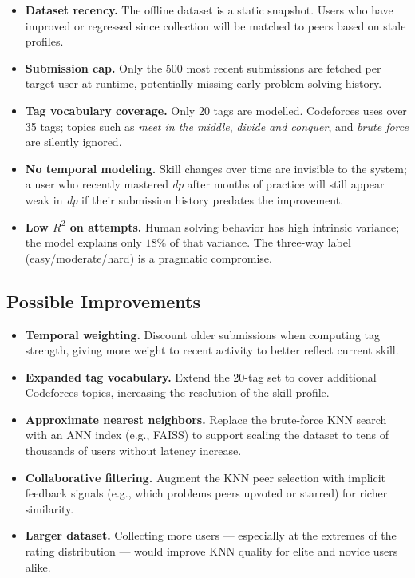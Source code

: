 \documentclass[12pt,a4paper]{article}
\begin{document}
\begin{itemize}
    \item \textbf{Dataset recency.} The offline dataset is a static snapshot.
          Users who have improved or regressed since collection will be matched
          to peers based on stale profiles.
    \item \textbf{Submission cap.} Only the 500 most recent submissions are
          fetched per target user at runtime, potentially missing early
          problem-solving history.
    \item \textbf{Tag vocabulary coverage.} Only 20 tags are modelled.
          Codeforces uses over 35 tags; topics such as \textit{meet in the
          middle}, \textit{divide and conquer}, and \textit{brute force} are
          silently ignored.
    \item \textbf{No temporal modeling.} Skill changes over time are invisible
          to the system; a user who recently mastered \textit{dp} after months
          of practice will still appear weak in \textit{dp} if their submission
          history predates the improvement.
    \item \textbf{Low $R^2$ on attempts.} Human solving behavior has high
          intrinsic variance; the model explains only $18\%$ of that variance.
          The three-way label (easy/moderate/hard) is a pragmatic compromise.
\end{itemize}

\subsection*{Possible Improvements}

\begin{itemize}
    \item \textbf{Temporal weighting.} Discount older submissions when computing
          tag strength, giving more weight to recent activity to better reflect
          current skill.
    \item \textbf{Expanded tag vocabulary.} Extend the 20-tag set to cover
          additional Codeforces topics, increasing the resolution of the skill
          profile.
    \item \textbf{Approximate nearest neighbors.} Replace the brute-force KNN
          search with an ANN index (e.g., FAISS) to support scaling the dataset
          to tens of thousands of users without latency increase.
    \item \textbf{Collaborative filtering.} Augment the KNN peer selection with
          implicit feedback signals (e.g., which problems peers upvoted or
          starred) for richer similarity.
    \item \textbf{Larger dataset.} Collecting more users --- especially at the
          extremes of the rating distribution --- would improve KNN quality for
          elite and novice users alike.
\end{itemize}
\end{document}
